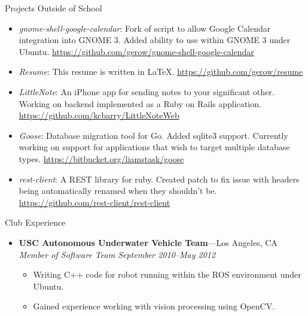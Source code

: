\documentclass[8pt,oneside]{article}
\newenvironment{ressection}[1]{
	\vspace{4pt}
	{\fontfamily{phv}\selectfont\large#1}
	\begin{itemize}
	\vspace{3pt}
}{
	\end{itemize}
}
\newcommand{\ressubitem}[1]{
	\vspace{-1pt}
	\item \begin{flushleft} #1 \end{flushleft}
}
\newcommand{\resbigitem}[3]{
	\vspace{-5pt}
	\item
	\textbf{#1}---#2 \\
	\textit{#3}
}
\newcommand{\resveryshortbigitem}[1]{
	\vspace{-5pt}
	\item
	\textbf{#1}
}
\newenvironment{ressubsec}[3]{
	\resbigitem{#1}{#2}{#3}
	\vspace{-2pt}
	\begin{itemize}
}{
	\end{itemize}
}
\newenvironment{resveryshortsubsec}[1]{
	\resveryshortbigitem{#1}
	\vspace{-2pt}
	\begin{itemize}
}{
    \end{itemize}
}
\begin{document}
\begin{ressection}{Projects Outside of School}
        \ressubitem{\emph{gnome-shell-google-calendar}: Fork of script to allow Google Calendar integration into GNOME 3. Added ability to use within GNOME 3 under Ubuntu. \url{https://github.com/gerow/gnome-shell-google-calendar}}
        \ressubitem{\emph{Resume}: This resume is written in \LaTeX. \url{https://github.com/gerow/resume}}
        \ressubitem{\emph{LittleNote}: An iPhone app for sending notes to your significant other.  Working on backend implemented as a Ruby on Rails application. \url{https://github.com/kcbarry/LittleNoteWeb}}
        \ressubitem{\emph{Goose}: Database migration tool for Go. Added sqlite3 support. Currently working on support for applications that wish to target multiple database types. \url{https://bitbucket.org/liamstask/goose}}
        \ressubitem{\emph{rest-client}: A REST library for ruby.  Created patch to fix issue with headers being automatically renamed when they shouldn't be. \url{https://github.com/rest-client/rest-client}}
\end{ressection}

\begin{ressection}{Club Experience}
	\begin{ressubsec}{USC Autonomous Underwater Vehicle Team}{Los Angeles, CA}{Member of Software Team September 2010--May 2012}
		\ressubitem{Writing C++ code for robot running within the ROS environment under Ubuntu.}
		\ressubitem{Gained experience working with vision processing using OpenCV.}
	\end{ressubsec}
\end{ressection}
\end{document}
